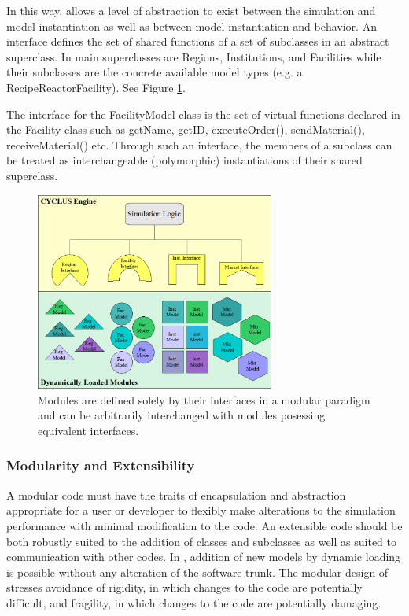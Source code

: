 In this way, \Cyclus allows a level of abstraction to exist between 
the simulation and model instantiation as well as between model 
instantiation and behavior.  An interface defines the set of shared 
functions of a set of subclasses in an abstract superclass. In \Cyclus
main superclasses are Regions, Institutions, and Facilities 
while their subclasses are the concrete available model types (e.g. a 
RecipeReactorFacility). See Figure \ref{fig:modularity}.

The interface for the FacilityModel class is the set of 
virtual functions declared in the Facility class such as getName, 
getID, executeOrder(), sendMaterial(), receiveMaterial() etc.  Through 
such an interface, the members of a subclass can be treated as 
interchangeable (polymorphic) instantiations of their shared 
superclass. 

\begin{figure}[htb!]
  \begin{center}
    \includegraphics[width=0.7\textwidth]{./chapters/paradigm/modularity.png}
  \end{center}
  \caption[Module Interfaces and Encapsulation]{Modules are defined solely 
  by their interfaces in a modular paradigm and can be arbitrarily 
  interchanged with modules posessing equivalent interfaces.}
  \label{fig:modularity}
\end{figure}


\subsubsection{Modularity and Extensibility}

A modular code must have the traits of encapsulation and abstraction 
appropriate for a user or developer to flexibly make alterations to 
the simulation performance with minimal modification to the code. An 
extensible code should be both robustly suited to the addition of 
classes and subclasses as well as suited to communication with other codes.
In \Cyclus, addition of new models by dynamic loading is possible without 
any alteration of the software trunk. The modular design of \Cyclus stresses
avoidance of rigidity, in which changes to the code are potentially difficult, 
and fragility, in which changes to the code are potentially damaging.

